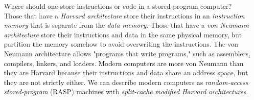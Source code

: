 Where should one store instructions or code in a stored-program computer? Those that have a \textit{Harvard architecture} store their instructions in an \textit{instruction memory} that is separate from the \textit{data memory}. Those that have a \textit{von Neumann architecture} store their instructions and data in the same physical memory, but partition the memory somehow to avoid overwriting the instructions. The von Neumann architecture allows "programs that write programs," such as assemblers, compilers, linkers, and loaders. Modern computers are more von Neumann than they are Harvard because their instructions and data share an address space, but they are not strictly either. We can describe modern computers as \textit{random-access stored-program} (RASP) machines with \textit{split-cache modified Harvard architectures}.


